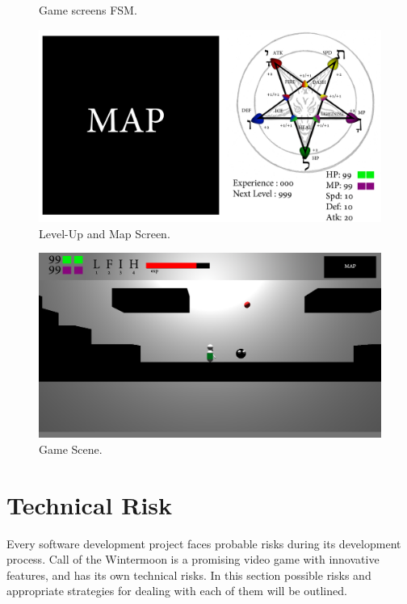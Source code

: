 \documentclass{article}
\begin{document}
\begin{figure}[h!]
{

}
\caption{Game screens FSM.}
\label{FSMMenus}
\end{figure}

\begin{figure}[h!]
\includegraphics[width=5in]{Graphics/StatusMenu.png}
\caption{Level-Up and Map Screen.}
\label{LevelupScreen}
\end{figure}

\begin{figure}[h!]
\includegraphics[width=5in]{Graphics/GameScene.png}
\caption{Game Scene.}
\label{GameScene}
\end{figure}


\section{Technical Risk}

Every software development project faces probable risks during its development process. Call of the Wintermoon is a promising video game with innovative features, and has its own technical risks.  In this section possible risks and appropriate strategies for dealing with each of them will be outlined.
\end{document}
